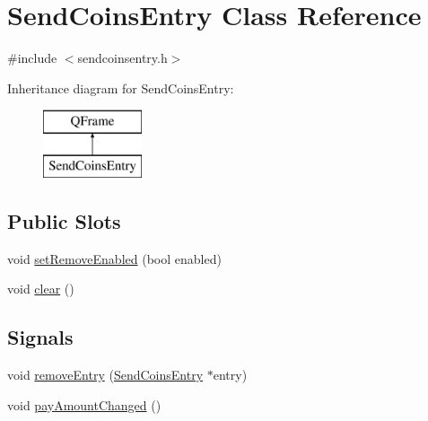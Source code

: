 \hypertarget{class_send_coins_entry}{}\section{Send\+Coins\+Entry Class Reference}
\label{class_send_coins_entry}


{\ttfamily \#include $<$sendcoinsentry.\+h$>$}

Inheritance diagram for Send\+Coins\+Entry\+:\begin{figure}[H]
\begin{center}
\leavevmode
\includegraphics[height=2.000000cm]{class_send_coins_entry}
\end{center}
\end{figure}
\subsection*{Public Slots}
\begin{DoxyCompactItemize}
\item 
void \hyperlink{class_send_coins_entry_ab4a8df95b2081b2c7c7cf40bebbcea5c}{set\+Remove\+Enabled} (bool enabled)
\item 
void \hyperlink{class_send_coins_entry_abff66fcd456c82144e7a2c410f5082ac}{clear} ()
\end{DoxyCompactItemize}
\subsection*{Signals}
\begin{DoxyCompactItemize}
\item 
void \hyperlink{class_send_coins_entry_a9105a4f91781f96b91a1da65da9032bf}{remove\+Entry} (\hyperlink{class_send_coins_entry}{Send\+Coins\+Entry} $\ast$entry)
\item 
void \hyperlink{class_send_coins_entry_a9f4fec53927c3ddd37ccea53f8d1e370}{pay\+Amount\+Changed} ()
\end{DoxyCompactItemize}
